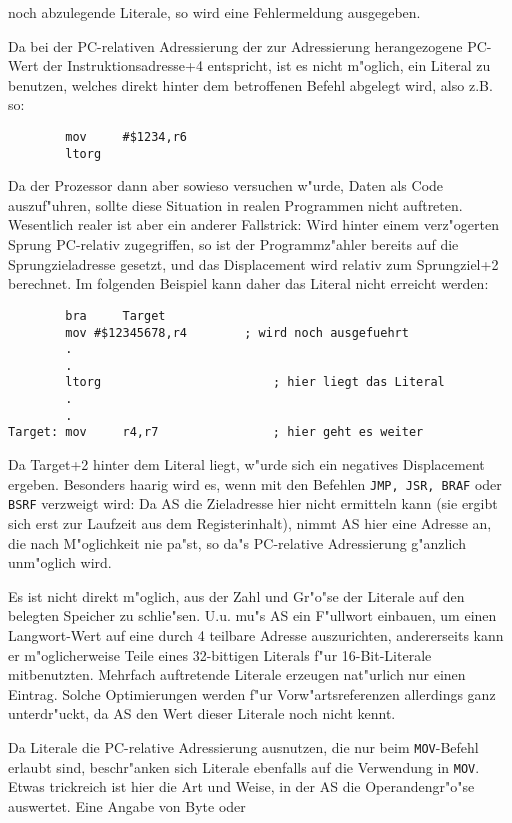 \documentclass[12pt,a4paper,twoside]{report}
\newcommand{\tty}[1]{{\tt #1}}
\begin{document}
{noch abzulegende Literale, so wird eine Fehlermeldung ausgegeben.
\par
Da bei der PC-relativen Adressierung der zur Adressierung herangezogene
PC-Wert der Instruktionsadresse+4 entspricht, ist es nicht m"oglich, ein
Literal zu benutzen, welches direkt hinter dem betroffenen Befehl abgelegt
wird, also z.B. so:
\begin{verbatim}
        mov     #$1234,r6
        ltorg
\end{verbatim}
Da der Prozessor dann aber sowieso versuchen w"urde, Daten als Code
auszuf"uhren, sollte diese Situation in realen Programmen nicht auftreten.
Wesentlich realer ist aber ein anderer Fallstrick:  Wird hinter einem
verz"ogerten Sprung PC-relativ zugegriffen, so ist der Programmz"ahler
bereits auf die Sprungzieladresse gesetzt, und das Displacement wird
relativ zum Sprungziel+2 berechnet.  Im folgenden Beispiel kann daher
das Literal nicht erreicht werden:
\begin{verbatim}
        bra     Target
        mov	#$12345678,r4        ; wird noch ausgefuehrt
        .
        .
        ltorg                        ; hier liegt das Literal
        .
        .
Target: mov     r4,r7                ; hier geht es weiter
\end{verbatim}
Da Target+2 hinter dem Literal liegt, w"urde sich ein negatives
Displacement ergeben.  Besonders haarig wird es, wenn mit den
Befehlen \tty{JMP, JSR, BRAF} oder \tty{BSRF} verzweigt wird:  Da AS die
Zieladresse hier nicht ermitteln kann (sie ergibt sich erst zur
Laufzeit aus dem Registerinhalt), nimmt AS hier eine Adresse an,
die nach M"oglichkeit nie pa"st, so da"s PC-relative Adressierung g"anzlich
unm"oglich wird.
\par
Es ist nicht direkt m"oglich, aus der Zahl und Gr"o"se der Literale
auf den belegten Speicher zu schlie"sen.  U.u. mu"s AS ein F"ullwort
einbauen, um einen Langwort-Wert auf eine durch 4 teilbare Adresse
auszurichten, andererseits kann er m"oglicherweise Teile eines
32-bittigen Literals f"ur 16-Bit-Literale mitbenutzten.  Mehrfach
auftretende Literale erzeugen nat"urlich nur einen Eintrag.  Solche
Optimierungen werden f"ur Vorw"artsreferenzen allerdings ganz
unterdr"uckt, da AS den Wert dieser Literale noch nicht kennt.
\par
Da Literale die PC-relative Adressierung ausnutzen, die nur beim
\tty{MOV}-Befehl erlaubt sind, beschr"anken sich Literale ebenfalls auf
die Verwendung in \tty{MOV}.  Etwas trickreich ist hier die Art und Weise,
in der AS die Operandengr"o"se auswertet.  Eine Angabe von Byte oder
}
\end{document}

